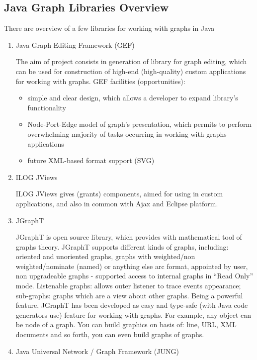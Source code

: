 \subsection{Java Graph Libraries Overview}


There are overview of a few libraries for working with graphs in Java

\begin{enumerate}

\item
Java Graph Editing Framework (GEF)~\cite{GEF}

The aim of project consists in generation of library for graph editing, which can be used for construction of high-end (high-quality) custom applications for working with graphs.
GEF facilities (opportunities):
\begin{itemize}
	\item simple and clear design, which allows a developer to expand library's functionality
	\item Node-Port-Edge model of graph's presentation, which permits to perform overwhelming majority of tasks occurring in working with graphs applications
	\item future XML-based format support (SVG)
\end{itemize}

\item
ILOG JViews~\cite{ILOG_Jview}

ILOG JViews gives (grants) components, aimed for using in custom applications, and also in common with Ajax and Eclipse platform.

\item
JGraphT~\cite{JGraphT}

JGraphT is open source library, which provides with mathematical tool of graphs theory. JGraphT supports different kinds of graphs, including: oriented and unoriented graphs, graphs with weighted/non weighted/nominate (named) or anything else arc format, appointed 	by user, non upgradeable graphs - supported access to internal graphs in ``Read Only'' mode. Listenable graphs: allows outer listener to trace events appearance; sub-graphs: graphs which are a view about other graphs. Being a powerful feature, JGraphT has been 	developed as easy and type-safe (with Java code generators use) feature for working with 	graphs. For example, any object can be node of a graph. You can build graphics on basis of: line, URL, XML documents and so forth, you can even build graphs of graphs.

\item
Java Universal Network / Graph Framework (JUNG)~\cite{JUNG}


\end{enumerate}
